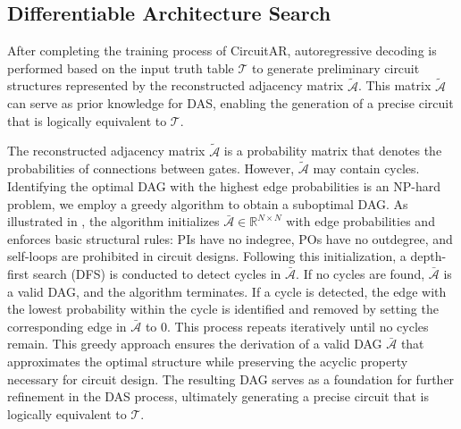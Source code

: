 \subsection{Differentiable Architecture Search}
\label{sec:das}

After completing the training process of CircuitAR, autoregressive decoding is performed based on the input truth table $\mathcal{T}$ to generate preliminary circuit structures represented by the reconstructed adjacency matrix $\tilde{\mathcal{A}}$. 
This matrix $\tilde{\mathcal{A}}$ can serve as prior knowledge for DAS, enabling the generation of a precise circuit that is logically equivalent to $\mathcal{T}$.

The reconstructed adjacency matrix $\tilde{\mathcal{A}}$ is a probability matrix that denotes the probabilities of connections between gates. 
However, $\tilde{\mathcal{A}}$ may contain cycles. 
Identifying the optimal DAG with the highest edge probabilities is an NP-hard problem, we employ a greedy algorithm to obtain a suboptimal DAG. 
As illustrated in , the algorithm initializes $\bar{\mathcal{A}} \in \mathbb{R}^{N \times N}$ with edge probabilities and enforces basic structural rules: PIs have no indegree, POs have no outdegree, and self-loops are prohibited in circuit designs. 
Following this initialization, a depth-first search (DFS) is conducted to detect cycles in $\bar{\mathcal{A}}$. 
If no cycles are found, $\bar{\mathcal{A}}$ is a valid DAG, and the algorithm terminates. 
If a cycle is detected, the edge with the lowest probability within the cycle is identified and removed by setting the corresponding edge in $\bar{\mathcal{A}}$ to 0. 
This process repeats iteratively until no cycles remain.
This greedy approach ensures the derivation of a valid DAG $\bar{\mathcal{A}}$ that approximates the optimal structure while preserving the acyclic property necessary for circuit design. 
The resulting DAG serves as a foundation for further refinement in the DAS process, ultimately generating a precise circuit that is logically equivalent to $\mathcal{T}$.

%
%

